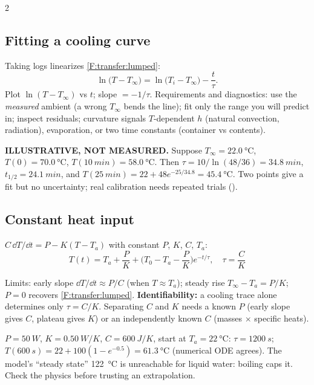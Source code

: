 \begin{multicols}{2}
\subsection{Fitting a cooling curve}\label{sec:coolingfit}
\CORE{} Taking logs linearizes \eqref{F:transfer:lumped}:
\begin{equation}
\ln\big(T-T_\infty\big)=\ln\big(T_i-T_\infty\big)-\frac{t}{\tau}. \label{F:transfer:semilog}
\end{equation}
Plot $\ln(T-T_\infty)$ vs $t$; slope $=-1/\tau$. Requirements and diagnostics: use the \emph{measured} ambient (a wrong $T_\infty$ bends the line); fit only the range you will predict in; inspect residuals; curvature signals $T$-dependent $h$ (natural convection, radiation), evaporation, or two time constants (container vs contents).

\begin{demobox}\textbf{ILLUSTRATIVE, NOT MEASURED.} Suppose $T_\infty=\SI{22.0}{\celsius}$, $T(0)=\SI{70.0}{\celsius}$, $T(\SI{10}{min})=\SI{58.0}{\celsius}$. Then $\tau=10/\ln(48/36)=\SI{34.8}{min}$, $t_{1/2}=\SI{24.1}{min}$, and $T(\SI{25}{min})=22+48e^{-25/34.8}=\SI{45.4}{\celsius}$. Two points give a fit but no uncertainty; real calibration needs repeated trials ().\end{demobox}

\subsection{Constant heat input}\label{sec:constinput}
\CORE{}
\begin{formulabox}$C\,\dd T/\dd t=P-K(T-T_a)$ with constant $P$, $K$, $C$, $T_a$:
\begin{equation}
T(t)=T_a+\frac{P}{K}+\Big(T_0-T_a-\frac{P}{K}\Big)e^{-t/\tau},\quad \tau=\frac{C}{K} \label{F:transfer:input}
\end{equation}
\end{formulabox}
Limits: early slope $\dd T/\dd t\approx P/C$ (when $T\approx T_a$); steady rise $T_\infty-T_a=P/K$; $P=0$ recovers \eqref{F:transfer:lumped}.
\textbf{Identifiability:} a cooling trace alone determines only $\tau=C/K$. Separating $C$ and $K$ needs a known $P$ (early slope gives $C$, plateau gives $K$) or an independently known $C$ (masses $\times$ specific heats).

\begin{demobox}$P=\SI{50}{W}$, $K=\SI{0.50}{W/K}$, $C=\SI{600}{J/K}$, start at $T_a=\SI{22}{\celsius}$: $\tau=\SI{1200}{s}$; $T(\SI{600}{s})=22+100(1-e^{-0.5})=\SI{61.3}{\celsius}$ (numerical ODE agrees). The model's ``steady state'' \SI{122}{\celsius} is unreachable for liquid water: boiling caps it. Check the physics before trusting an extrapolation.\end{demobox}


\end{multicols}
